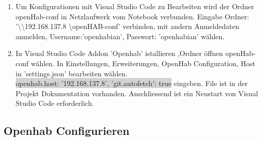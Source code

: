 \begin{enumerate}
\item Um Konfigurationen mit Visual Studio Code zu Bearbeiten wird der Ordner openHab-conf in Netzlaufwerk vom Notebook verbunden. Eingabe Ordner: '\textbackslash \textbackslash 192.168.137.8 \textbackslash openHAB-conf' verbinden, mit andern Anmeldedaten anmelden, Username:'openhabian', Passwort: 'openhabian' wählen.

\item In Visual Studio Code Addon 'Openhab' istallieren ,Ordner öffnen openHab-conf wählen. In Einstellungen, Erweiterungen, OpenHab Configuration, Host in 'settings.json' bearbeiten wählen. \\
\colorbox{lightgray}{openhab.host: '192.168.137.8',
	'git.autofetch': true} eingeben. File ist in der Projekt Dokumentation vorhanden. Anschliessend ist ein Neustart von Visual Studio Code erforderlich.
   
   
 \end{enumerate}
\subsection{Openhab Configurieren}

